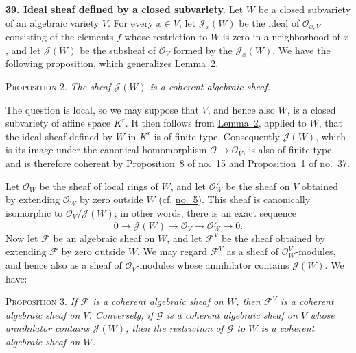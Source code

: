 
\medskip
{}\label{fac:II:2:no:39}
\textbf{39. Ideal sheaf defined by a closed subvariety.}
\label{fac:II:2:no:39:def:ideal-sheaf}
Let $W$ be a closed subvariety of an algebraic variety $V$. For every $x\in V$, let $\mathcal{J}_x(W)$ be the ideal of $\mathcal{O}_{x,V}$ consisting of the elements $f$ whose restriction to $W$ is zero in a neighborhood of $x$, and let $\mathcal{J}(W)$ be the subsheaf of $\mathcal{O}_V$ formed by the $\mathcal{J}_x(W)$. We have the \hyperref[fac:II:2:no:39:prop:2]{following proposition}, which generalizes \hyperref[fac:II:2:no:37:lemma:2]{Lemma~2}.

\label{fac:II:2:no:39:prop:2}
\textsc{Proposition 2.} \textit{The sheaf $\mathcal{J}(W)$ is a coherent algebraic sheaf.}

The question is local, so we may suppose that $V$, and hence also $W$, is a closed subvariety of affine space $K^r$. It then follows from \hyperref[fac:II:2:no:37:lemma:2]{Lemma~2}, applied to $W$, that the ideal sheaf defined by $W$ in $K^r$ is of finite type. Consequently $\mathcal{J}(W)$, which is its image under the canonical homomorphism $\mathcal{O}\to\mathcal{O}_V$, is also of finite type, and is therefore coherent by \hyperref[fac:I:2:no:15:prop:8]{Proposition~8 of no.~15} and \hyperref[fac:II:2:no:37:prop:1]{Proposition~1 of no.~37}.

Let $\mathcal{O}_W$ be the sheaf of local rings of $W$, and let $\mathcal{O}_W^V$ be the sheaf on $V$ obtained by extending $\mathcal{O}_W$ by zero outside $W$ (cf. \hyperref[fac:I:1:no:5]{no.~5}). This sheaf is canonically isomorphic to $\mathcal{O}_V/\mathcal{J}(W)$; in other words, there is an exact sequence
\[
0\longrightarrow\mathcal{J}(W)\longrightarrow\mathcal{O}_V
 \longrightarrow\mathcal{O}_W^V\longrightarrow0.
\]
Now let $\mathcal{F}$ be an algebraic sheaf on $W$, and let $\mathcal{F}^V$ be the sheaf obtained by extending $\mathcal{F}$ by zero outside $W$. We may regard $\mathcal{F}^V$ as a sheaf of $\mathcal{O}_W^V$-modules, and hence also as a sheaf of $\mathcal{O}_V$-modules whose annihilator contains $\mathcal{J}(W)$. We have:

\label{fac:II:2:no:39:prop:3}
\textsc{Proposition 3.} \textit{If $\mathcal{F}$ is a coherent algebraic sheaf on $W$, then $\mathcal{F}^V$ is a coherent algebraic sheaf on $V$. Conversely, if $\mathcal{G}$ is a coherent algebraic sheaf on $V$ whose annihilator contains $\mathcal{J}(W)$, then the restriction of $\mathcal{G}$ to $W$ is a coherent algebraic sheaf on $W$.}

